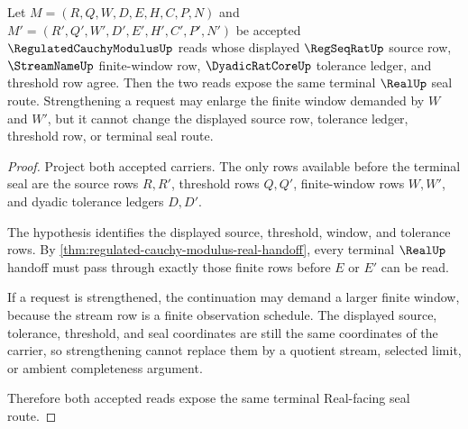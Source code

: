 \begin{theorem}
\label{thm:regulated-cauchy-modulus-tail-threshold-determinacy}
Let $M=(R,Q,W,D,E,H,C,P,N)$ and $M'=(R',Q',W',D',E',H',C',P',N')$ be accepted $\RegulatedCauchyModulusUp$ reads whose displayed $\RegSeqRatUp$ source row, $\StreamNameUp$ finite-window row, $\DyadicRatCoreUp$ tolerance ledger, and threshold row agree. Then the two reads expose the same terminal $\RealUp$ seal route. Strengthening a request may enlarge the finite window demanded by $W$ and $W'$, but it cannot change the displayed source row, tolerance ledger, threshold row, or terminal seal route.
\end{theorem}
\begin{proof}
Project both accepted carriers. The only rows available before the terminal seal are the source rows $R,R'$, threshold rows $Q,Q'$, finite-window rows $W,W'$, and dyadic tolerance ledgers $D,D'$.

The hypothesis identifies the displayed source, threshold, window, and tolerance rows. By \autoref{thm:regulated-cauchy-modulus-real-handoff}, every terminal $\RealUp$ handoff must pass through exactly those finite rows before $E$ or $E'$ can be read.

If a request is strengthened, the continuation may demand a larger finite window, because the stream row is a finite observation schedule. The displayed source, tolerance, threshold, and seal coordinates are still the same coordinates of the carrier, so strengthening cannot replace them by a quotient stream, selected limit, or ambient completeness argument.

Therefore both accepted reads expose the same terminal Real-facing seal route.
\end{proof}


\begin{closurestatus}{\RegulatedCauchyModulusUp}
  \theoryclosure{\seedClosure}
  \formalstatus{\unformalizedV}
\end{closurestatus}
